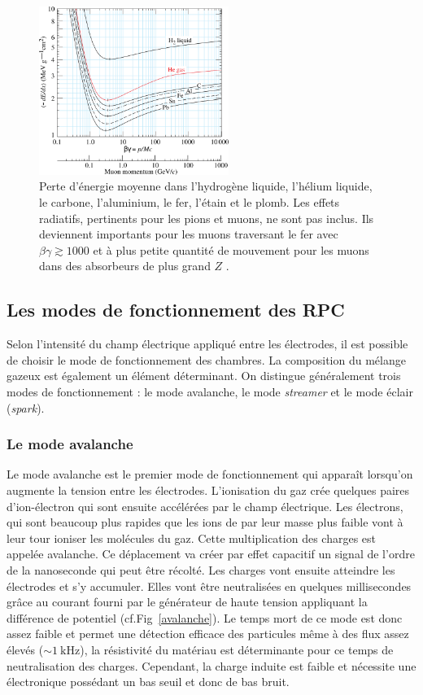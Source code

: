 \begin{figure}[ht!]
	\centering
	\includegraphics[width=0.55\textwidth]{RPC/energylost.png}
	\captionsetup{type=figure}\caption{Perte d'énergie moyenne dans l'hydrogène liquide, l'hélium liquide, le carbone, l'aluminium, le fer, l'étain et le plomb. Les effets radiatifs, pertinents pour les pions et muons, ne sont pas inclus. Ils deviennent importants pour les muons traversant le fer avec $\beta\gamma\gtrsim1000$ et à plus petite quantité de mouvement pour les muons dans des absorbeurs de plus grand $Z$ \cite{Olive:2016xmw}.}
	\label{mat}
\end{figure}

\subsection{Les modes de fonctionnement des RPC}

Selon l'intensité du champ électrique appliqué entre les électrodes, il est possible de choisir le mode de fonctionnement des chambres. La composition du mélange gazeux est également un élément déterminant. On distingue généralement trois modes de fonctionnement : le mode avalanche, le mode \textit{streamer} et le mode éclair (\textit{spark}).

\subsubsection{Le mode avalanche}

Le mode avalanche est le premier mode de fonctionnement qui apparaît lorsqu'on augmente la tension entre les électrodes. L'ionisation du gaz crée quelques paires d'ion-électron qui sont ensuite accélérées par le champ électrique. Les électrons, qui sont beaucoup plus rapides que les ions de par leur masse plus faible vont à leur tour ioniser les molécules du gaz. Cette multiplication des charges est appelée avalanche. Ce déplacement va créer par effet capacitif un signal de l'ordre de la nanoseconde qui peut être récolté. Les charges vont ensuite atteindre les électrodes et s'y accumuler. Elles vont être neutralisées en quelques millisecondes grâce au courant fourni par le générateur de haute tension appliquant la différence de potentiel (cf.Fig~\ref{avalanche}). Le temps mort de ce mode est donc assez faible et permet une détection efficace des particules même à des flux assez élevés ($\sim\SI{1}{\kilo\hertz}$), la résistivité du matériau est déterminante pour ce temps de neutralisation des charges. Cependant, la charge induite est faible et nécessite une électronique possédant un bas seuil et donc de bas bruit.

